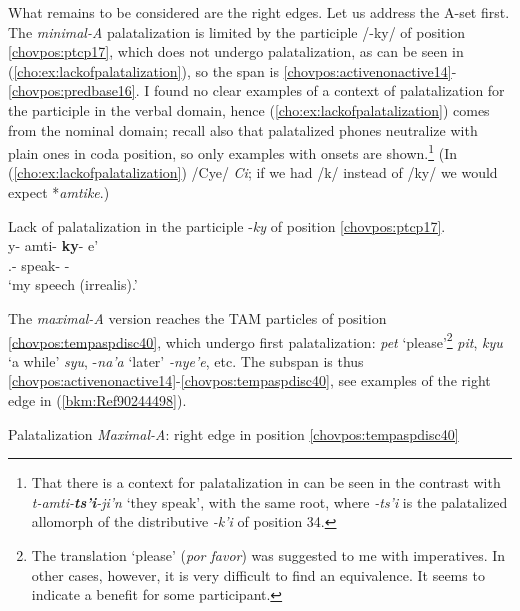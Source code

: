 \documentclass[output=paper]{langscibook}
\begin{document}
What remains to be considered are the right edges. Let us address the A{}-set first. The \textit{minimal{}-A} palatalization is limited by the participle /-ky/ of position \ref{chovpos:ptcp17}, which does not undergo palatalization, as can be seen in (\ref{cho:ex:lackofpalatalization}), so the span is \ref{chovpos:activenonactive14}{}-\ref{chovpos:predbase16}. I found no clear examples of a context of palatalization for the participle in the verbal domain, hence (\ref{cho:ex:lackofpalatalization}) comes from the nominal domain; recall also that palatalized phones neutralize with plain ones in coda position, so only examples with onsets are shown.\footnote{That there is a context for palatalization in  can be seen in the contrast with \textit{t-amti-}\textbf{\textit{ts'i}}\textit{{}-ji'n} `they speak', with the same root, where \textit{-ts'i} is the palatalized allomorph of the distributive \textit{-k'i} of position 34.} (In (\ref{cho:ex:lackofpalatalization}) /Cye/ \MVRightarrow{} \textit{Ci}; if we had /k/ instead of /ky/ we would expect *\textit{amtike}.)

\ea\label{cho:ex:lackofpalatalization}Lack of palatalization in the participle -\textit{ky} of position \ref{chovpos:ptcp17}.\\ 
\gll y- amti- \textbf{ky}{}- e'\\
\First\Sg.\Poss{}- speak- \textbf{\Pp{}}- \Irr{}\\
\glt `my speech (irrealis).'
\z 


The \textit{maximal{}-A} version reaches the TAM particles of position \ref{chovpos:tempaspdisc40}, which undergo first palatalization: \textit{pet} `please'\footnote{The translation `please' (\textit{por favor}) was suggested to me with imperatives. In other cases, however, it is very difficult to find an equivalence. It seems to indicate a benefit for some participant.} \MVRightarrow{} \textit{pit}, \textit{kyu} `a while' \MVRightarrow{} \textit{syu}, -\textit{na'a} `later' \MVRightarrow{} \textit{{}-nye'e}, etc. The subspan is thus \ref{chovpos:activenonactive14}{}-\ref{chovpos:tempaspdisc40}, see examples of the right edge in (\ref{bkm:Ref90244498}).

\ea\label{bkm:Ref90244498}Palatalization \textit{Maximal-A}: right edge in position \ref{chovpos:tempaspdisc40}\\
    \z
\z 
\end{document}
